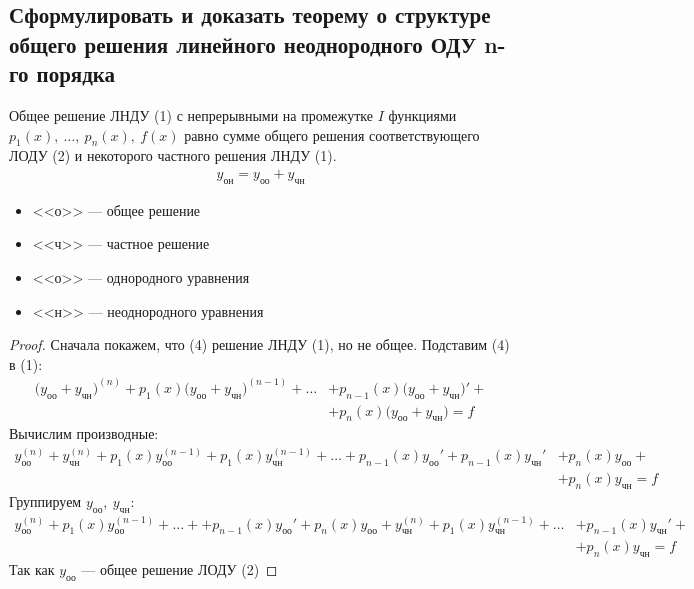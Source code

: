 \newpage
\subsection{Сформулировать и доказать теорему о структуре общего решения линейного неоднородного ОДУ n-го порядка}

\begin{theorem*}
    Общее решение ЛНДУ (1) с непрерывными на промежутке $I$ функциями\break $p_1(x),\ \ldots,\ p_n(x),\ f(x)$ равно сумме общего решения соответствующего ЛОДУ (2) и некоторого частного решения ЛНДУ (1).
    \begin{gather}
        \boxed{y_{\text{он}} = y_{\text{оо}} + y_{\text{чн}}}
    \end{gather}
    \begin{itemize}
        \item <<о>> --- общее решение
        \item <<ч>> --- частное решение
        \item <<о>> --- однородного уравнения
        \item <<н>> --- неоднородного уравнения
    \end{itemize}
\end{theorem*}
\begin{proof}
    Сначала покажем, что (4) решение ЛНДУ (1), но не общее. Подставим (4) в (1):
    \begin{align*}
        \Big(y_{\text{оо}} + y_{\text{чн}}\Big)^{(n)} + p_1(x) \Big(y_{\text{оо}} + y_{\text{чн}}\Big)^{(n-1)} + \ldots &+ p_{n-1}(x) \Big(y_{\text{оо}} + y_{\text{чн}}\Big)' + \\
        &+ p_n(x) \Big(y_{\text{оо}} + y_{\text{чн}}\Big) = f
    \end{align*}
    Вычислим производные:
    \begin{align*}
        y_{\text{оо}}^{(n)} + y_{\text{чн}}^{(n)} + p_1(x)y_{\text{оо}}^{(n-1)} + p_1(x) y_{\text{чн}}^{(n-1)} + \ldots + p_{n-1}(x)y_{\text{оо}}' + p_{n-1}(x) y_{\text{чн}}' &+ p_{n}(x)y_{\text{оо}} + \\
        &+ p_{n}(x) y_{\text{чн}} = f
    \end{align*}
    Группируем $y_{\text{оо}},\ y_{\text{чн}}\colon$
    \begin{align*}
        y_{\text{оо}}^{(n)} + p_1(x)y_{\text{оо}}^{(n-1)} + \ldots + + p_{n-1}(x)y_{\text{оо}}' + p_{n}(x)y_{\text{оо}} + y_{\text{чн}}^{(n)} + p_1(x) y_{\text{чн}}^{(n-1)} + \ldots &+ p_{n-1}(x) y_{\text{чн}}' + \\
        &+ p_{n}(x) y_{\text{чн}} = f
    \end{align*}
    Так как $y_{\text{оо}}$ --- общее решение ЛОДУ (2)
\end{proof}


